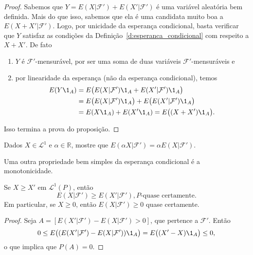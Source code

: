 \begin{proof}
  Sabemos que $Y = E(X|\mathcal{F}') + E(X'|\mathcal{F}')$ é uma variável aleatória bem definida.
  Mais do que isso, sabemos que ela é uma candidata muito boa a $E(X + X'|\mathcal{F}')$.
  Logo, por unicidade da esperança condicional, basta verificar que $Y$ satisfaz as condições da Definição~\ref{d:esperanca_condicional} com respeito a $X + X'$.
  De fato
  \begin{enumerate}[\quad a)]
  \item $Y$ é $\mathcal{F}'$-mensurável, por ser uma soma de duas variáveis $\mathcal{F}'$-mensuráveis e
  \item por linearidade da esperança (não da esperança condicional), temos
    \begin{equation}
      \begin{split}
        E(Y \1_A) & = E\big( E(X|\mathcal{F}')\1_A + E(X'|\mathcal{F}')\1_A \big)\\
        & = E\big( E(X|\mathcal{F}')\1_A\big) + E\big(E(X'|\mathcal{F}')\1_A \big)\\
        & = E(X \1_A) + E(X' \1_A) = E\big( (X + X') \1_A \big).
      \end{split}
    \end{equation}
  \end{enumerate}
  Isso termina a prova do proposição.
\end{proof}

\begin{exercise}
  Dados $X \in \mathcal{L}^1$ e $\alpha \in \mathbb{R}$, mostre que $E(\alpha X|\mathcal{F}') = \alpha E(X|\mathcal{F}')$.
\end{exercise}

Uma outra propriedade bem simples da esperança condicional é a monotonicidade.

\begin{lemma}
  \label{l:ec_mono}
  Se $X \geq X'$ em $\mathcal{L}^1(P)$, então
  \begin{equation}
    E(X|\mathcal{F}') \geq E(X'|\mathcal{F}'), \text{$P$-quase certamente.}
  \end{equation}
  Em particular, se $X \geq 0$, então $E(X|\mathcal{F}') \geq 0$ quase certamente.
\end{lemma}

\begin{proof}
  Seja $A = [E(X'|\mathcal{F}') - E(X|\mathcal{F}') > 0]$, que pertence a $\mathcal{F}'$.
  Então
  \begin{equation}
    0 \leq E\big( (E(X'|\mathcal{F}') - E(X|\mathcal{F}')) \1_A \big) = E\big((X' - X) \1_A\big) \leq 0,
  \end{equation}
  o que implica que $P(A) = 0$.
\end{proof}

